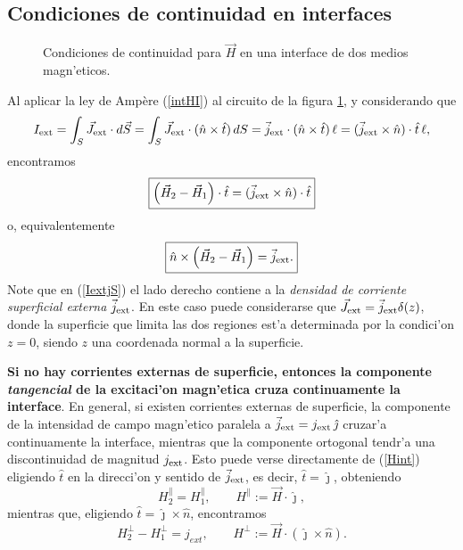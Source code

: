 \subsection{Condiciones de continuidad en interfaces}
\begin{figure}[!h]
\centerline{}
\caption{Condiciones de continuidad para $\vec{H}$ en una interface de dos
medios magn'eticos.}
\label{BM1}
\end{figure}
Al aplicar la ley de Amp\`ere (\ref{intHI}) al circuito de la figura \ref{BM1},
y considerando que
\begin{equation}\label{IextjS}
 I_{\rm ext}=\int_S\vec{J}_{\rm ext}\cdot d\vec{S}=\int_S\vec{J}_{\rm ext}\cdot
(\hat{n}\times\hat{t})\,dS=\vec{j}_{\rm ext}\cdot
(\hat{n}\times\hat{t})\,\ell=(\vec{j}_{\rm ext}\times\hat{n})\cdot\hat{t}\,\ell ,
\end{equation}
encontramos
\begin{equation}
 \boxed{\left(\vec{H}_2-\vec{H}_1\right)\cdot\hat{t}=(\vec{j}_{\rm
ext}\times\hat{n})\cdot\hat{t}} \label{Hint}
\end{equation}
o, equivalentemente
\begin{equation}
\boxed{\hat{n}\times\left(\vec{H}_2-\vec{H}_1\right)=\vec{j}_{\rm
ext}.}
\end{equation}
Note que en (\ref{IextjS}) el lado derecho contiene a la \textit{densidad de corriente superficial externa} $\vec{j}_{\rm ext}$. En este caso puede considerarse que $\vec{J}_{\rm ext}=\vec{j}_{\rm ext}\delta(z)$, donde la superficie que limita las dos regiones est'a determinada por la condici'on $z=0$, siendo $z$ una coordenada normal a la superficie.

\textbf{Si no hay corrientes externas de superficie, entonces la componente \textit{tangencial} de la excitaci'on magn'etica cruza continuamente la interface}. En general, si
existen corrientes externas de superficie, la componente de la intensidad de
campo magn'etico paralela a $\vec{j}_{\rm ext}=j_{\rm ext}\,\hat{\jmath}$ cruzar'a continuamente la interface, mientras que la componente ortogonal tendr'a una discontinuidad de magnitud $j_{\rm ext}$. Esto puede verse directamente
de (\ref{Hint}) eligiendo $\hat{t}$ en la direcci'on y sentido de
$\vec{j}_{\rm ext}$, es decir, $\hat{t}=\hat{\jmath}$, obteniendo
\begin{equation}
 H_2^\parallel=H_1^\parallel,  \qquad H^\parallel:=\vec{H}\cdot\hat{\jmath},
\end{equation}
mientras que, eligiendo $\hat{t}=\hat{\jmath}\times\hat{n}$, encontramos
\begin{equation}
 H_2^\perp-H_1^\perp=j_{ext},  \qquad
H^\perp:=\vec{H}\cdot(\hat{\jmath}\times\hat{n}).
\end{equation}

